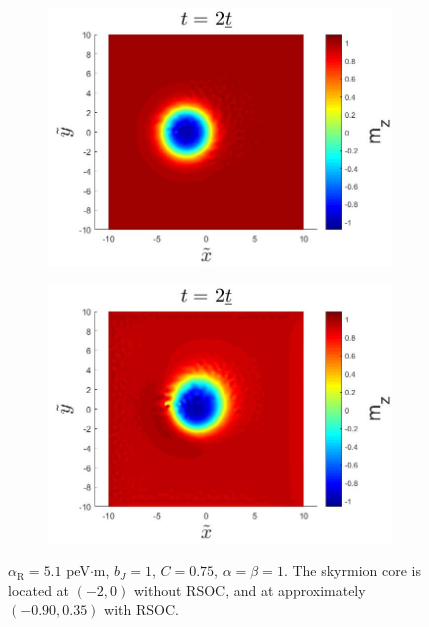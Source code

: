 \begin{figure}[h!]
\begin{subfigure}{.45\textwidth}
  \centering
  \includegraphics[width=\linewidth]{Figures/SkyrmionMzRSOCR0.jpg}
  \caption{}
\end{subfigure}
\begin{subfigure}{.45\textwidth}
  \centering
  \includegraphics[width=\linewidth]{Figures/SkyrmionMzRSOC.jpg}
  \caption{}
\end{subfigure}
\caption{$\alpha_{\text{R}}=5.1$ peV$\cdot$m, $b_J=1$, $C=0.75$, $\alpha=\beta=1$. The skyrmion core is located at $\left(-2,0\right)$ without RSOC, and at approximately $\left(-0.90,0.35\right)$ with RSOC. }
\label{fig:SkyrmionRSOC}
\end{figure}

